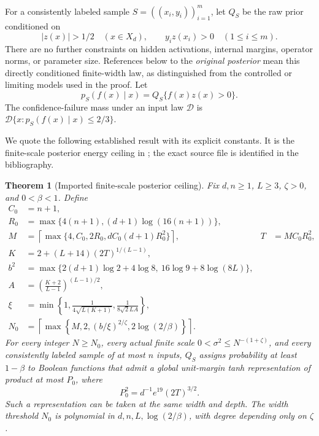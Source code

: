 \documentclass[11pt]{article}
\newtheorem{theorem}{Theorem}[section]
\theoremstyle{remark}
\begin{document}
For a consistently labeled sample $S=((x_i,y_i))_{i=1}^m$, let $Q_S$
be the raw prior conditioned on
\[
 |z(x)|>1/2\quad(x\in X_d),\qquad
 y_i z(x_i)>0\quad(1\le i\le m).
\]
There are no further constraints on hidden activations, internal
margins, operator norms, or parameter size. References below to the
\emph{original posterior} mean this directly conditioned finite-width
law, as distinguished from the controlled or limiting models used in
the proof. Let
\[
 p_S(f(x)\mid x)=Q_S\{f(x)z(x)>0\}.
\]
The confidence-failure mass under an input law $\mathcal D$ is
$\mathcal D\{x:p_S(f(x)\mid x)\le2/3\}$.

We quote the following established result with its explicit constants.
It is the finite-scale posterior energy ceiling in
\cite[section ``A posterior energy ceiling and a necessary
representation condition'']{unrestricted}; the exact source file is
identified in the bibliography.

\begin{theorem}[Imported finite-scale posterior ceiling]
\label{thm:ceiling}
Fix $d,n\ge1$, $L\ge3$, $\zeta>0$, and $0<\beta<1$. Define
\begin{align*}
 C_0&=n+1,\\
 R_0&=\max\{4(n+1),(d+1)\log(16(n+1))\},\\
 M&=\left\lceil\max\{4,C_0,2R_0,dC_0(d+1)R_0^2\}\right\rceil,
 &T&=MC_0R_0^2,\\
 K&=2+(L+14)(2T)^{1/(L-1)},\\
 b^2&=\max\{2(d+1)\log2+4\log8,\ 16\log9+8\log(8L)\},\\
 A&=\left(\frac{K+2}{L-1}\right)^{(L-1)/2},\\
 \xi&=\min\left\{1,\frac1{4\sqrt{L(K+1)}},
                         \frac1{8\sqrt2 LA}\right\},\\
 N_0&=\left\lceil\max\left\{M,2,(b/\xi)^{2/\zeta},
                                      2\log(2/\beta)\right\}\right\rceil.
\end{align*}
For every integer $N\ge N_0$, every actual finite scale
$0<\sigma^2\le N^{-(1+\zeta)}$, and every consistently labeled sample
of at most $n$ inputs, $Q_S$ assigns probability at least $1-\beta$ to
Boolean functions that admit a global unit-margin tanh representation
of product at most $P_0$, where
\[
 \boxed{\quad P_0^2=d^{-1}e^{19}(2T)^{3/2}.\quad}
\]
Such a representation can be taken at the same width and depth.
The width threshold $N_0$ is polynomial in
$d,n,L,\log(2/\beta)$, with degree depending only on $\zeta$.
\end{theorem}
\end{document}
